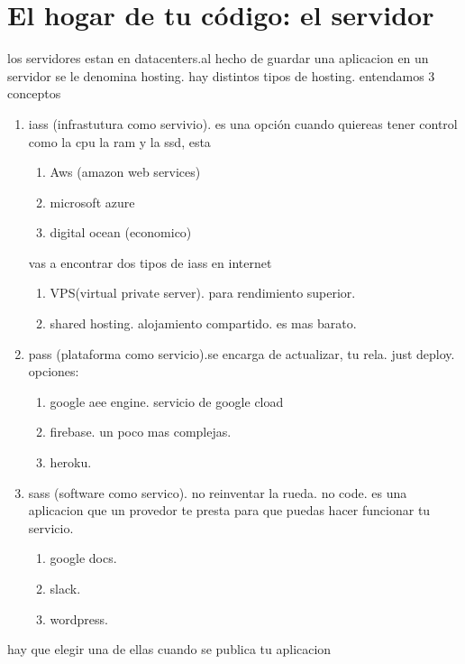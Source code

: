 \documentclass{article}
\begin{document}
    \section{El hogar de tu código: el servidor}
    los servidores estan en datacenters.al hecho de guardar una aplicacion
    en un servidor se le denomina hosting. hay distintos tipos de hosting. entendamos 3 conceptos
    \begin{enumerate}
        \item iass (infrastutura como servivio). es una opción cuando quiereas tener control como la cpu la ram y la ssd, esta \begin{enumerate}
            \item Aws (amazon web services) 
            \item microsoft azure
            \item digital ocean (economico)
        \end{enumerate}
        vas a encontrar dos tipos de iass en internet 
        \begin{enumerate}
            \item VPS(virtual private server). para rendimiento superior.
            \item shared hosting. alojamiento compartido. es mas barato.
        \end{enumerate}
        \item pass (plataforma como servicio).se encarga de actualizar, tu rela. 
        just deploy. opciones: \begin{enumerate}
            \item google aee engine. servicio de google cload
            \item firebase. un poco mas complejas.
            \item heroku. 
        \end{enumerate}
        \item sass (software como servico). no reinventar la rueda. no code. 
        es una aplicacion que un provedor te presta para que puedas hacer funcionar tu servicio.
        \begin{enumerate}
            \item google docs.
            \item slack.
            \item wordpress.
        \end{enumerate}
        
    \end{enumerate}    
    hay que elegir una de ellas cuando se publica tu aplicacion
\end{document}
